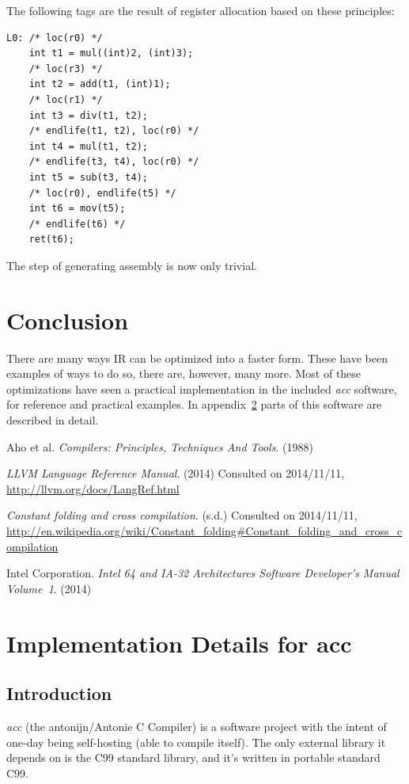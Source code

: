 \documentclass[12pt, a4paper]{article}
\begin{document}
The following tags are the result of register allocation based on these principles:

\begin{lstlisting}
L0:	/* loc(r0) */
	int t1 = mul((int)2, (int)3);
	/* loc(r3) */
	int t2 = add(t1, (int)1);
	/* loc(r1) */
	int t3 = div(t1, t2);
	/* endlife(t1, t2), loc(r0) */
	int t4 = mul(t1, t2);
	/* endlife(t3, t4), loc(r0) */
	int t5 = sub(t3, t4);
	/* loc(r0), endlife(t5) */
	int t6 = mov(t5);
	/* endlife(t6) */
	ret(t6);
\end{lstlisting}

The step of generating assembly is now only trivial.

\section{Conclusion}
There are many ways IR can be optimized into a faster form. These have been
examples of ways to do so, there are, however, many more. Most of these
optimizations have seen a practical implementation in the included \textit{acc}
software, for reference and practical examples. In appendix~\ref{sec:accdet} parts
of this software are described in detail.

\begin{thebibliography}{9}
   Aho et al.
  \emph{Compilers: Principles, Techniques And Tools}.
  (1988)

  \emph{LLVM Language Reference Manual}. (2014) Consulted on 2014/11/11,
  \url{http://llvm.org/docs/LangRef.html}

  \emph{Constant folding and cross compilation}. (s.d.) Consulted on 2014/11/11,
  \url{http://en.wikipedia.org/wiki/Constant_folding#Constant_folding_and_cross_compilation}

  Intel Corporation.
  \emph{Intel\textregistered{} 64 and IA-32 Architectures Software Developer's
Manual Volume~1}.
  (2014)

\end{thebibliography}


\newpage
\appendix
\section{Implementation Details for acc}
\label{sec:accdet}
\subsection{Introduction}
  \textit{acc} (the antonijn/Antonie C Compiler) is a software project with the intent of
one-day being self-hosting (able to compile itself). The only external library
it depends on is the C99 standard library, and it's written in portable standard C99.
\end{document}
